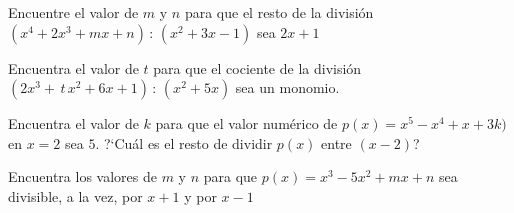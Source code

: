\begin{mipropuesto}

Encuentre el valor de $m$ y $n$ para que el resto de la división $(x^4+2x^3+mx+n)\, :\, (x^2+3x-1)$ sea $2x+1$
\end{mipropuesto}

\vspace{-8mm}
\begin{flushright}
	\begin{footnotesize} \textcolor{gris}{}	\end{footnotesize}
\end{flushright}


\begin{mipropuesto}

Encuentra el valor de $t$ para que el cociente de la división $(2x^3+\, t \, x^2+6x+1)\, : \, (x^2+5x)$ sea un monomio.
\end{mipropuesto}

\vspace{-8mm}
\begin{flushright}
	\begin{footnotesize} \textcolor{gris}{}	\end{footnotesize}
\end{flushright}



\begin{mipropuesto}

Encuentra el valor de $k$ para que el valor numérico de $p(x)=x^5-x^4+x+3k)$ en $x=2$ sea $5$. ?`Cuál es el resto de dividir $p(x)$ entre $(x-2)$?
\end{mipropuesto}

\vspace{-8mm}
\begin{flushright}
	\begin{footnotesize} \textcolor{gris}{}	\end{footnotesize}
\end{flushright}


\begin{mipropuesto}

Encuentra los valores de $m$ y $n$ para que $p(x)=x^3-5x^2+mx+n$ sea divisible, a la vez, por $x+1$ y por $x-1$
\end{mipropuesto}

\vspace{-8mm}
\begin{flushright}
	\begin{footnotesize} \textcolor{gris}{}	\end{footnotesize}
\end{flushright}

